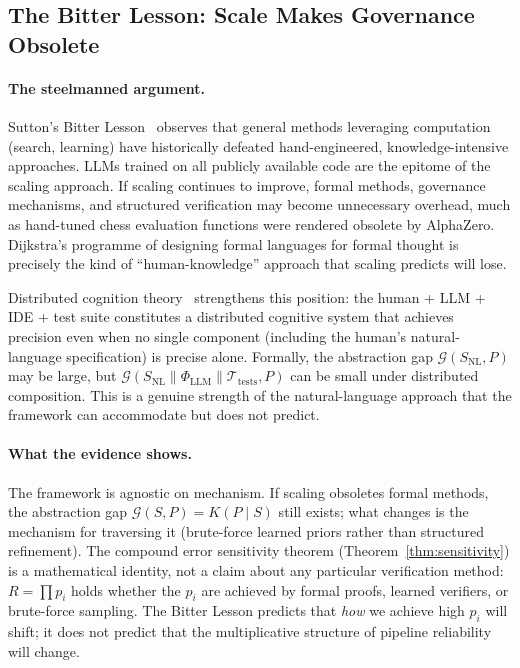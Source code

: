 \subsection{The Bitter Lesson: Scale Makes Governance Obsolete}
\label{sec:contrarian-bitter}

\paragraph{The steelmanned argument.}
Sutton's Bitter Lesson~\citep{sutton2019bitter} observes that general methods
leveraging computation (search, learning) have historically defeated
hand-engineered, knowledge-intensive approaches.  LLMs trained on all publicly
available code are the epitome of the scaling approach.  If scaling continues to
improve, formal methods, governance mechanisms, and structured verification may
become unnecessary overhead, much as hand-tuned chess evaluation functions were
rendered obsolete by AlphaZero.  Dijkstra's programme of designing formal
languages for formal thought is precisely the kind of ``human-knowledge''
approach that scaling predicts will lose.

Distributed cognition theory~\citep{hutchins1995cognition, clark2003natural}
strengthens this position: the human + LLM + IDE + test suite constitutes a
distributed cognitive system that achieves precision even when no single
component (including the human's natural-language specification) is precise
alone.  Formally, the abstraction gap $\mathcal{G}(S_{\text{NL}}, P)$ may be
large, but $\mathcal{G}(S_{\text{NL}} \parallel \Phi_{\text{LLM}} \parallel
\mathcal{T}_{\text{tests}}, P)$ can be small under distributed composition.
This is a genuine strength of the natural-language approach that the framework
can accommodate but does not predict.

\paragraph{What the evidence shows.}
The framework is agnostic on mechanism.  If scaling obsoletes formal methods,
the abstraction gap $\mathcal{G}(S, P) = K(P \mid S)$ still exists; what
changes is the mechanism for traversing it (brute-force learned priors rather
than structured refinement).  The compound error sensitivity theorem
(Theorem~\ref{thm:sensitivity}) is a mathematical identity, not a claim about
any particular verification method: $R = \prod p_i$ holds whether the $p_i$ are
achieved by formal proofs, learned verifiers, or brute-force sampling.  The
Bitter Lesson predicts that \emph{how} we achieve high $p_i$ will shift; it
does not predict that the multiplicative structure of pipeline reliability will
change.

